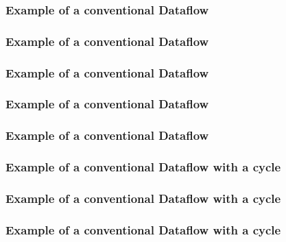 \documentclass{beamer}
\begin{document}
\begin{frame}
  \frametitle{Example of a conventional Dataflow}
  \begin{center}
    
  \end{center}
\end{frame}

\begin{frame}
  \frametitle{Example of a conventional Dataflow}
  \begin{center}
    
  \end{center}
\end{frame}

\begin{frame}
  \frametitle{Example of a conventional Dataflow}
  \begin{center}
    
  \end{center}
\end{frame}

\begin{frame}
  \frametitle{Example of a conventional Dataflow}
  \begin{center}
    
  \end{center}
\end{frame}

\begin{frame}
  \frametitle{Example of a conventional Dataflow}
  \begin{center}
    
  \end{center}
\end{frame}

\begin{frame}[fragile]
  \frametitle{Example of a conventional Dataflow with a cycle}
  \begin{center}
    
  \end{center}
\end{frame}

\begin{frame}
  \frametitle{Example of a conventional Dataflow with a cycle}
  \begin{center}
    
  \end{center}
\end{frame}

\begin{frame}
  \frametitle{Example of a conventional Dataflow with a cycle}
  \begin{center}
    
  \end{center}
\end{frame}
\end{document}
